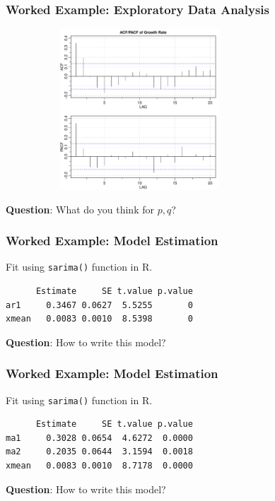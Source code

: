 \documentclass[%
xcolor=pdftex]{beamer}
\begin{document}
\begin{frame}
\frametitle{Worked Example: Exploratory Data Analysis}

\includegraphics[width=100mm, height=60mm]{acf.pdf}

\textbf{Question}: What do you think for $p, q$?

\end{frame}

\begin{frame}[fragile]
\frametitle{Worked Example: Model Estimation}

Fit using \verb=sarima()= function in R.

\begin{verbatim}
      Estimate     SE t.value p.value
ar1     0.3467 0.0627  5.5255       0
xmean   0.0083 0.0010  8.5398       0
\end{verbatim}

\textbf{Question}: How to write this model?

\end{frame}

\begin{frame}[fragile]
\frametitle{Worked Example: Model Estimation}

Fit using \verb=sarima()= function in R.

\begin{verbatim}
      Estimate     SE t.value p.value
ma1     0.3028 0.0654  4.6272  0.0000
ma2     0.2035 0.0644  3.1594  0.0018
xmean   0.0083 0.0010  8.7178  0.0000
\end{verbatim}

\textbf{Question}: How to write this model?

\end{frame}
\end{document}

